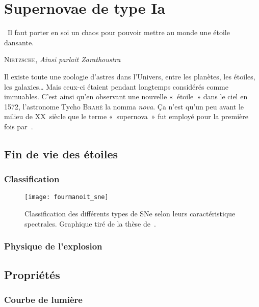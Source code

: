 \documentclass[../main/main.tex]{subfiles}
\begin{document}
\dominitoc
\faketableofcontents
\dominilof
\fakelistoffigures
\dominilot
\fakelistoftables

\chapter{Supernovae de type Ia}\label{ch:sne}

\epigraph{\openquote\ Il faut porter en soi un chaos pour pouvoir mettre
au monde une étoile dansante.\closequote}{\textsc{Nietzsche}, \textit{Ainsi
parlait Zarathoustra}}

Il existe toute une zoologie d'astres dans l'Univers, entre les planètes, les
étoiles, les galaxies… Mais ceux-ci étaient pendant longtemps considérés comme
immuables. C'est ainsi qu'en observant une nouvelle «~étoile~» dans le ciel en
1572, l'astronome Tycho \textsc{Brahé} la nomma \textit{nova}. Ça n'est qu'un
peu avant le milieu de XX\ieme~siècle que le terme «~supernova~» fut employé
pour la première fois par~\cite{baade1934}.

\vfill
\minitoc
\vfill
\newpage

\section{Fin de vie des étoiles}\label{sec:death}
\subsection{Classification}\label{ssec:class} %

\begin{figure}[ht]
    \centering
    \texttt{[image: fourmanoit\_sne]}
    \caption[Classification des différents types de SNe selon leurs
    caractéristique spectrales]{Classification des différents types de SNe selon leurs
    caractéristique spectrales. Graphique tiré de la thèse
de~\cite{fourmanoit2010}.}\label{fig:sne_class}
\end{figure}

\subsection{Physique de l'explosion}\label{ssec:explo}

\section{Propriétés}\label{sec:sneprop}
\subsection{Courbe de lumière}\label{ssec:lc}
\end{document}
